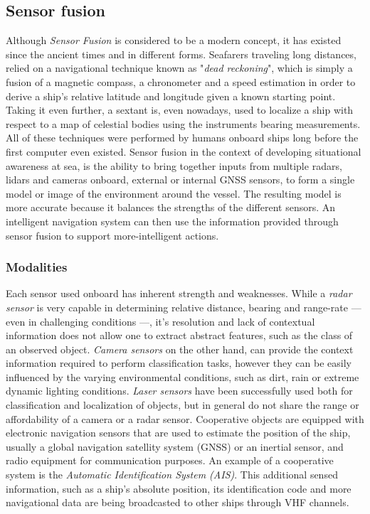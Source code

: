 \subsection{Sensor fusion}
Although \emph{Sensor Fusion} is considered to be a modern concept, it has existed since the ancient times and in different forms. Seafarers traveling long distances, relied on a navigational technique known as "\emph{dead reckoning}", which is simply a fusion of a magnetic compass, a chronometer and a speed estimation in order to derive a ship's relative latitude and longitude given a known starting point. Taking it even further, a sextant is, even nowadays, used to localize a ship with respect to a map of celestial bodies using the instruments bearing measurements. All of these techniques were performed by humans onboard ships long before the first computer even existed. Sensor fusion in the context of developing situational awareness at sea, is the ability to bring together inputs from multiple radars, lidars and cameras onboard, external or internal GNSS sensors, to form a single model or image of the environment around the vessel. The resulting model is more accurate because it balances the strengths of the different sensors. An intelligent navigation system can then use the information provided through sensor fusion to support more-intelligent actions.
\subsubsection{Modalities}
Each sensor used onboard has inherent strength and weaknesses.  While a \emph{radar sensor} is very capable in determining relative distance, bearing and range-rate --- even in challenging conditions ---, it's resolution and lack of contextual information does not allow one to extract abstract features, such as the class of an observed object. \emph{Camera sensors} on the other hand, can provide the context information required to perform classification tasks, however they can be easily influenced by the varying environmental conditions, such as dirt, rain or extreme dynamic lighting conditions. \emph{Laser sensors} have been successfully used both for classification and localization of objects, but in general do not share the range or affordability of a camera or a radar sensor. Cooperative objects are equipped with electronic navigation sensors that are used to estimate the position of the ship, usually a global navigation satellity system (GNSS) or an inertial sensor, and radio equipment for communication purposes. An example of a cooperative system is the \emph{Automatic Identification System (AIS)}. This additional sensed information, such as a ship's absolute position, its identification code and more navigational data are being broadcasted to other ships through VHF channels.


